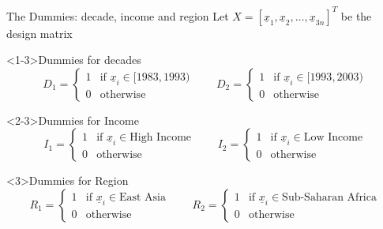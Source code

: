 \documentclass[9pt]{beamer}
\begin{document}
\begin{frame}{The Dummies: decade, income and region}
	Let ${X} = \left[\underline{x}_1,\underline{x}_2,\ldots,\underline{x}_{3n} \right]^T$ be the design matrix
	\begin{block}<1-3>{Dummies for decades}
		\begin{equation}
		D_1 = 
		\begin{cases} 
		1 & \text{if } \underline{x}_i \in [1983,1993) \\
		0       & \text{otherwise}
		\end{cases}
		\qquad
		D_2 = 
		\begin{cases} 
		1 & \text{if } \underline{x}_i \in [1993,2003) \\
		0       & \text{otherwise}
		\end{cases}
		\end{equation}
	\end{block}
	\begin{block}<2-3>{Dummies for Income}
		\begin{equation}
		I_1 = 
		\begin{cases} 
		1 & \text{if } \underline{x}_i \in \text{High Income} \\
		0       & \text{otherwise}
		\end{cases}
		\qquad
		I_2 = 
		\begin{cases} 
		1 & \text{if } \underline{x}_i \in \text{Low Income} \\
		0       & \text{otherwise}
		\end{cases}
		\end{equation}
	\end{block}
	\begin{block}{Dummies for Region}
		\begin{equation}
		R_1 = 
		\begin{cases} 
		1 & \text{if } \underline{x}_i \in \text{East Asia} \\
		0       & \text{otherwise}
		\end{cases}
		\qquad
		R_2 = 
		\begin{cases} 
		1 & \text{if } \underline{x}_i \in \text{Sub-Saharan Africa} \\
		0       & \text{otherwise}
		\end{cases}
		\end{equation}
	\end{block}
\end{frame}
\end{document}
